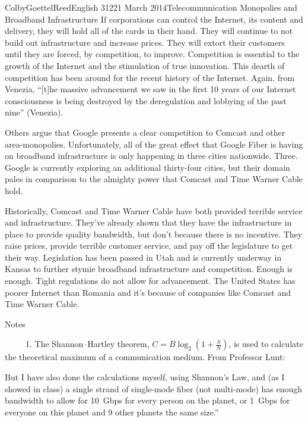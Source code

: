\documentclass[12pt]{article}
\begin{document}
\begin{mla}{Colby}{Goettel}{Reed}{English 312}{21 March 2014}{Telecommunication Monopolies and Broadband Infrastructure}
If corporations can control the Internet, its content and delivery, they will hold all of the cards in their hand. They will continue to not build out infrastructure and increase prices. They will extort their customers until they are forced, by competition, to improve. Competition is essential to the growth of the Internet and the stimulation of true innovation. This dearth of competition has been around for the recent history of the Internet. Again, from Venezia, ``[t]he massive advancement we saw in the first 10 years of our Internet consciousness is being destroyed by the deregulation and lobbying of the past nine'' (Venezia).

Others argue that Google presents a clear competition to Comcast and other area-monopolies. Unfortunately, all of the great effect that Google Fiber is having on broadband infrastructure is only happening in three cities nationwide. Three. Google is currently exploring an additional thirty-four cities, but their domain pales in comparison to the almighty power that Comcast and Time Warner Cable hold.

Historically, Comcast and Time Warner Cable have both provided terrible service and infrastructure. They've already shown that they have the infrastructure in place to provide quality bandwidth, but don't because there is no incentive. They raise prices, provide terrible customer service, and pay off the legislature to get their way. Legislation has been passed in Utah and is currently underway in Kansas to further stymie broadband infrastructure and competition. Enough is enough. Tight regulations do not allow for advancement. The United States has poorer Internet than Romania and it's because of companies like Comcast and Time Warner Cable.

\newpage
\begin{center}
    Notes
\end{center}
\ \ \ \ \ 1. The Shannon--Hartley theorem, $C=B\log_2\left(1+\frac{S}{N}\right)$, is used to calculate the theoretical maximum of a communication medium. From Professor Lunt:
\begin{mlaquote}
    But I have also done the calculations myself, using Shannon's Law, and (as I showed in class) a single strand of single-mode fiber (not multi-mode) has enough bandwidth to allow for 10~Gbps for every person on the planet, or 1~Gbps for everyone on this planet and 9 other planets the same size.''
\end{mlaquote}


\end{mla}
\end{document}
